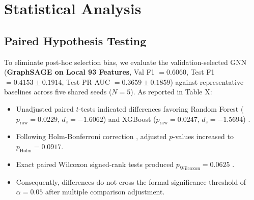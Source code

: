 \documentclass[conference]{IEEEtran}
\begin{document}
\section{Statistical Analysis}

\subsection{Paired Hypothesis Testing}
To eliminate post-hoc selection bias, we evaluate the validation-selected GNN (\textbf{GraphSAGE on Local 93 Features}, Val F1 $= 0.6060$, Test F1 $= 0.4153 \pm 0.1914$, Test PR-AUC $= 0.3659 \pm 0.1859$) against representative baselines across five shared seeds ($N=5$). As reported in Table X:
\begin{itemize}
    \item Unadjusted paired $t$-tests indicated differences favoring Random Forest ($p_{\text{raw}} = 0.0229$, $d_z = -1.6062$) and XGBoost ($p_{\text{raw}} = 0.0247$, $d_z = -1.5694$) \cite{cohen1988statistical, lakens2013calculating}.
    \item Following Holm-Bonferroni correction \cite{holm1979simple}, adjusted $p$-values increased to $p_{\text{Holm}} = 0.0917$.
    \item Exact paired Wilcoxon signed-rank tests produced $p_{\text{Wilcoxon}} = 0.0625$ \cite{wilcoxon1945individual, demsar2006statistical}.
    \item Consequently, differences do not cross the formal significance threshold of $\alpha = 0.05$ after multiple comparison adjustment.
\end{itemize}
\end{document}

